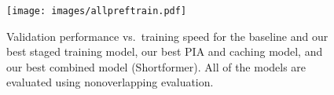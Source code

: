 \documentclass[11pt,a4paper]{article}
\begin{document}
\begin{figure}[h!] 
\centering
\texttt{[image: images/allpreftrain.pdf]}
   
  
 \caption{ \label{fig:all} Validation performance vs.~training speed for the baseline and our best staged training model, our best PIA and caching model, and our best combined model (Shortformer). All of the models are evaluated using nonoverlapping evaluation.  
 } 
\end{figure} 
 
\end{document}
